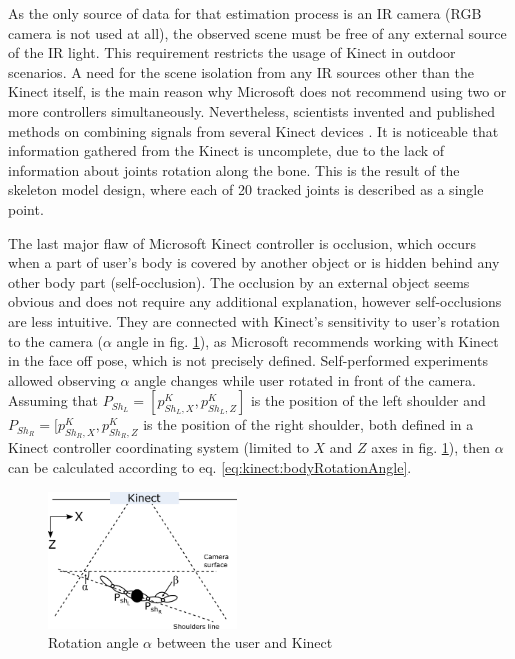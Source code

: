 \documentclass[sensors,article,submit,moreauthors,pdftex,10pt,a4paper]{mdpi}
\begin{document}
As the only source of data for that estimation process is an IR camera (RGB camera is not used at all), the observed scene must be free of any external source of the IR light. This requirement restricts the usage of Kinect in outdoor scenarios. A need for the scene isolation from any IR sources other than the Kinect itself, is the main reason why Microsoft does not recommend using two or more controllers simultaneously. Nevertheless, scientists invented and published methods on combining signals from several Kinect devices \cite{Asteriadis2013,Kitsikidis2011,Schroder2011}. It is noticeable that information gathered from the Kinect is uncomplete, due to the lack of information about joints rotation along the bone. This is the result of the skeleton model design, where each of 20 tracked joints is described as a single point.

The last major flaw of Microsoft Kinect controller is occlusion, which occurs when a part of user’s body is covered by another object or is hidden behind any other body part (self-occlusion). The occlusion by an external object seems obvious and does not require any additional explanation, however self-occlusions are less intuitive. They are connected with Kinect’s sensitivity to user’s rotation to the camera ($\alpha$ angle in fig. \ref{fig:kinect:rotationAngle}), as Microsoft recommends working with Kinect in the face off pose, which is not precisely defined. Self-performed experiments allowed observing $\alpha$ angle changes while user rotated in front of the camera. Assuming that $P_{Sh_L} = [p^K_{{Sh}_L,X} , p^K_{{Sh}_L,Z}]$ is the position of the left shoulder and $P_{Sh_R} = [p^K_{{Sh}_R,X} , p^K_{{Sh}_R,Z}$ is the position of the right shoulder, both defined in a Kinect controller coordinating system (limited to $X$ and $Z$ axes in fig. \ref{fig:kinect:rotationAngle}), then $\alpha$ can be calculated according to eq. \ref{eq:kinect:bodyRotationAngle}.
	
	\begin{figure}[H]
		\centering
		\includegraphics[width=5cm]{Figure3.png}
		\caption{Rotation angle $\alpha$ between the user and Kinect}
		\label{fig:kinect:rotationAngle}
	\end{figure}
	
\end{document}
